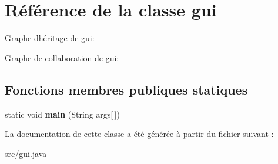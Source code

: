 \hypertarget{classgui}{}\section{Référence de la classe gui}
\label{classgui}


Graphe d\textquotesingle{}héritage de gui\+:


Graphe de collaboration de gui\+:
\subsection*{Fonctions membres publiques statiques}
\begin{DoxyCompactItemize}
\item 
\mbox{\label{classgui_a9edfc57ef370ee23311a4730209ce58e}} 
static void {\bfseries main} (String args\mbox{[}$\,$\mbox{]})
\end{DoxyCompactItemize}


La documentation de cette classe a été générée à partir du fichier suivant \+:\begin{DoxyCompactItemize}
\item 
src/gui.\+java\end{DoxyCompactItemize}
